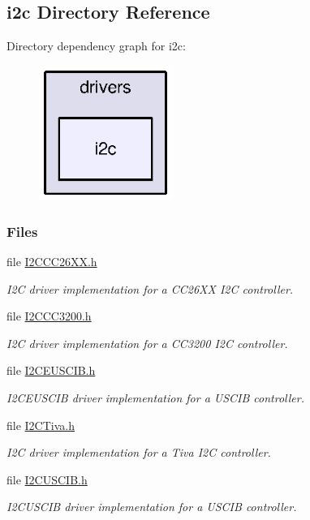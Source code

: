 \subsection{i2c Directory Reference}
\label{dir_4c0bb77e0e84c77a30bc5ffd8eeb46d3}
Directory dependency graph for i2c\-:
\nopagebreak
\begin{figure}[H]
\begin{center}
\leavevmode
\includegraphics[width=123pt]{dir_4c0bb77e0e84c77a30bc5ffd8eeb46d3_dep}
\end{center}
\end{figure}
\subsubsection*{Files}
\begin{DoxyCompactItemize}
\item 
file \hyperlink{_i2_c_c_c26_x_x_8h}{I2\-C\-C\-C26\-X\-X.\-h}
\begin{DoxyCompactList}\small\item\em I2\-C driver implementation for a C\-C26\-X\-X I2\-C controller. \end{DoxyCompactList}\item 
file \hyperlink{_i2_c_c_c3200_8h}{I2\-C\-C\-C3200.\-h}
\begin{DoxyCompactList}\small\item\em I2\-C driver implementation for a C\-C3200 I2\-C controller. \end{DoxyCompactList}\item 
file \hyperlink{_i2_c_e_u_s_c_i_b_8h}{I2\-C\-E\-U\-S\-C\-I\-B.\-h}
\begin{DoxyCompactList}\small\item\em I2\-C\-E\-U\-S\-C\-I\-B driver implementation for a U\-S\-C\-I\-B controller. \end{DoxyCompactList}\item 
file \hyperlink{_i2_c_tiva_8h}{I2\-C\-Tiva.\-h}
\begin{DoxyCompactList}\small\item\em I2\-C driver implementation for a Tiva I2\-C controller. \end{DoxyCompactList}\item 
file \hyperlink{_i2_c_u_s_c_i_b_8h}{I2\-C\-U\-S\-C\-I\-B.\-h}
\begin{DoxyCompactList}\small\item\em I2\-C\-U\-S\-C\-I\-B driver implementation for a U\-S\-C\-I\-B controller. \end{DoxyCompactList}\end{DoxyCompactItemize}
